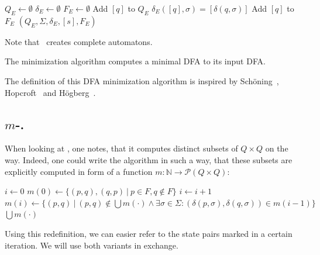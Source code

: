 \begin{enumerate}
	\vspace{0.2cm}
	\begin{algorithmic}[1] \label{ch:1:minmerge}
		 
            \State $Q_E \gets \emptyset$
            \State $\delta_E \gets \emptyset$
            \State $F_E \gets \emptyset$
                \State Add $[q]$ to $Q_E$
                    \State $\delta_E([q], \sigma) = [\delta(q, \sigma)]$
                \EndFor
                    \State Add $[q]$ to $F_E$
                \EndIf
            \EndFor
			\State \Return $(Q_E, \Sigma, \delta_E, [s], F_E)$
		\EndFunction
	\end{algorithmic}
	Note that \RemEq\ creates complete automatons.
\end{enumerate}
\begin{theorem}\label{ch:1:min-alg-correct}
	The minimization algorithm computes a minimal DFA to its input DFA.
\end{theorem}
\noindent The definition of this DFA minimization algorithm is inspired by Schöning~\cite[p. 46]{schoening01}, Hopcroft~\cite[p. 161]{hopcroft01} and Högberg~\cite[p. 10]{hoegberg20}.

\subsection{$m$-\CompDist.}

When looking at \CompDist, one notes, that it computes distinct subsets of $Q \times Q$ on the way. Indeed, one could write the algorithm in such a way, that these subsets are explicitly computed in form of a function $m\colon\mathbb{N}\to\mathcal{P}(Q\times Q)$:
\vspace{0.2cm}
\begin{algorithmic}[1] \label{ch:1:m-minmark}
	\State $i \gets 0$
	\State $m(0) \gets \{ (p,q), (q,p)\ |\ p \in F, q \notin F \}$
	\Do
		\State $i \gets i + 1$
		\State $m(i) \gets \{ (p,q)\ |\ (p,q) \notin \bigcup{m(\cdot)} \land \exists \sigma \in \Sigma \colon (\delta(p,\sigma), \delta(q,\sigma)) \in m(i-1) \}$
	\State \Return $\bigcup{m(\cdot)}$
	\EndFunction
\end{algorithmic}
\vspace{0.2cm}
Using this redefinition, we can easier refer to the state pairs marked in a certain iteration. We will use both variants in exchange.

